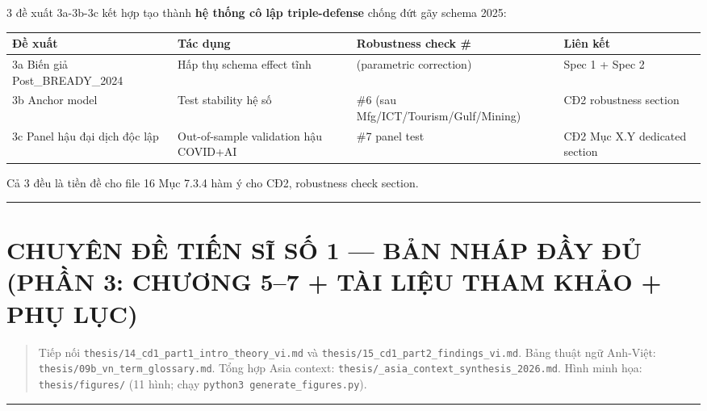 \documentclass[12pt,a4paper]{article}
\begin{document}
3 đề xuất 3a-3b-3c kết hợp tạo thành \textbf{hệ thống cô lập
triple-defense} chống đứt gãy schema 2025:

\begin{longtable}[]{@{}llll@{}}
\toprule\noalign{}
Đề xuất & Tác dụng & Robustness check \# & Liên kết \\
\midrule\noalign{}
\endhead
\bottomrule\noalign{}
\endlastfoot
3a Biến giả Post\_BREADY\_2024 & Hấp thụ schema effect tĩnh &
(parametric correction) & Spec 1 + Spec 2 \\
3b Anchor model & Test stability hệ số & \#6 (sau
Mfg/ICT/Tourism/Gulf/Mining) & CĐ2 robustness section \\
3c Panel hậu đại dịch độc lập & Out-of-sample validation hậu COVID+AI &
\#7 panel test & CĐ2 Mục X.Y dedicated section \\
\end{longtable}

Cả 3 đều là tiền đề cho file 16 Mục 7.3.4 hàm ý cho CĐ2, robustness
check section.

\begin{center}\rule{0.5\linewidth}{0.5pt}\end{center}

\hypertarget{chuyuxean-ux111ux1ec1-tiux1ebfn-sux129-sux1ed1-1--bux1ea3n-nhuxe1p-ux111ux1ea7y-ux111ux1ee7-phux1ea7n-3-chux1b0ux1a1ng-57--tuxe0i-liux1ec7u-tham-khux1ea3o--phux1ee5-lux1ee5c}{%
\section{CHUYÊN ĐỀ TIẾN SĨ SỐ 1 --- BẢN NHÁP ĐẦY ĐỦ (PHẦN 3: CHƯƠNG 5--7
+ TÀI LIỆU THAM KHẢO + PHỤ
LỤC)}\label{chuyuxean-ux111ux1ec1-tiux1ebfn-sux129-sux1ed1-1--bux1ea3n-nhuxe1p-ux111ux1ea7y-ux111ux1ee7-phux1ea7n-3-chux1b0ux1a1ng-57--tuxe0i-liux1ec7u-tham-khux1ea3o--phux1ee5-lux1ee5c}}

\begin{quote}
Tiếp nối \texttt{thesis/14\_cd1\_part1\_intro\_theory\_vi.md} và
\texttt{thesis/15\_cd1\_part2\_findings\_vi.md}. Bảng thuật ngữ
Anh-Việt: \texttt{thesis/09b\_vn\_term\_glossary.md}. Tổng hợp Asia
context: \texttt{thesis/\_asia\_context\_synthesis\_2026.md}. Hình minh
họa: \texttt{thesis/figures/} (11 hình; chạy
\texttt{python3\ generate\_figures.py}).
\end{quote}

\begin{center}\rule{0.5\linewidth}{0.5pt}\end{center}
\end{document}
